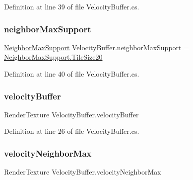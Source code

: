 Definition at line 39 of file Velocity\+Buffer.\+cs.

\mbox{\label{class_velocity_buffer_aefa83034e3376b9ff4b675afca2677d3}} 
\subsubsection{\texorpdfstring{neighbor\+Max\+Support}{neighborMaxSupport}}
{\footnotesize\ttfamily \mbox{\hyperlink{class_velocity_buffer_a2ab38673d716b1fe0286001d9545841a}{Neighbor\+Max\+Support}} Velocity\+Buffer.\+neighbor\+Max\+Support = \mbox{\hyperlink{class_velocity_buffer_a2ab38673d716b1fe0286001d9545841aa83363948170f4d30fa8409dde65992b4}{Neighbor\+Max\+Support.\+Tile\+Size20}}}



Definition at line 40 of file Velocity\+Buffer.\+cs.

\mbox{\label{class_velocity_buffer_a83972f10466377a2722cd251bfb73868}} 
\subsubsection{\texorpdfstring{velocity\+Buffer}{velocityBuffer}}
{\footnotesize\ttfamily Render\+Texture Velocity\+Buffer.\+velocity\+Buffer}



Definition at line 26 of file Velocity\+Buffer.\+cs.

\mbox{\label{class_velocity_buffer_a7d00846a27b7a8b8121da962fa8cb0af}} 
\subsubsection{\texorpdfstring{velocity\+Neighbor\+Max}{velocityNeighborMax}}
{\footnotesize\ttfamily Render\+Texture Velocity\+Buffer.\+velocity\+Neighbor\+Max}



